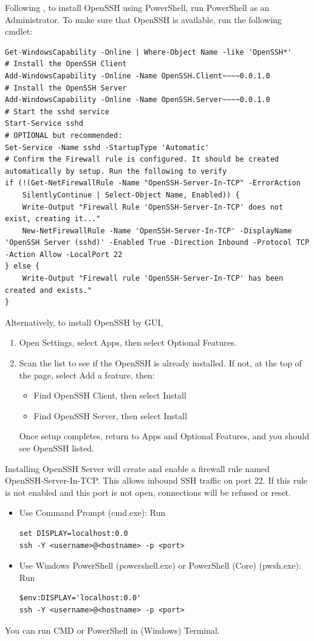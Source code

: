 \documentclass[a4paper,12pt,twoside]{article}
\begin{document}
Following \cite{mslearnssh}, to install OpenSSH using PowerShell, run PowerShell as an Administrator. To make sure that OpenSSH is available, run the following cmdlet:
\begin{verbatim}
Get-WindowsCapability -Online | Where-Object Name -like 'OpenSSH*'
# Install the OpenSSH Client
Add-WindowsCapability -Online -Name OpenSSH.Client~~~~0.0.1.0
# Install the OpenSSH Server
Add-WindowsCapability -Online -Name OpenSSH.Server~~~~0.0.1.0
# Start the sshd service
Start-Service sshd
# OPTIONAL but recommended:
Set-Service -Name sshd -StartupType 'Automatic'
# Confirm the Firewall rule is configured. It should be created automatically by setup. Run the following to verify
if (!(Get-NetFirewallRule -Name "OpenSSH-Server-In-TCP" -ErrorAction
    SilentlyContinue | Select-Object Name, Enabled)) {
    Write-Output "Firewall Rule 'OpenSSH-Server-In-TCP' does not exist, creating it..."
    New-NetFirewallRule -Name 'OpenSSH-Server-In-TCP' -DisplayName 'OpenSSH Server (sshd)' -Enabled True -Direction Inbound -Protocol TCP -Action Allow -LocalPort 22
} else {
    Write-Output "Firewall rule 'OpenSSH-Server-In-TCP' has been created and exists."
}
\end{verbatim}
Alternatively, to install OpenSSH by GUI,
\begin{enumerate}
    \item Open Settings, select Apps, then select Optional Features.
    \item Scan the list to see if the OpenSSH is already installed. If not, at the top of the page, select Add a feature, then:
    \begin{itemize}
        \item Find OpenSSH Client, then select Install
        \item Find OpenSSH Server, then select Install
    \end{itemize}
    Once setup completes, return to Apps and Optional Features, and you should see OpenSSH listed.
\end{enumerate}
Installing OpenSSH Server will create and enable a firewall rule named OpenSSH-Server-In-TCP. This allows inbound SSH traffic on port 22. If this rule is not enabled and this port is not open, connections will be refused or reset.

\begin{itemize}
    \item Use Command Prompt (cmd.exe): Run
    \begin{verbatim}
set DISPLAY=localhost:0.0
ssh -Y <username>@<hostname> -p <port>
    \end{verbatim}
    \item Use Windows PowerShell (powershell.exe) or PowerShell (Core) (pwsh.exe): Run \cite{pwshx11}
    \begin{verbatim}
$env:DISPLAY='localhost:0.0'
ssh -Y <username>@<hostname> -p <port>
    \end{verbatim}
\end{itemize}
You can run CMD or PowerShell in (Windows) Terminal.
\end{document}
